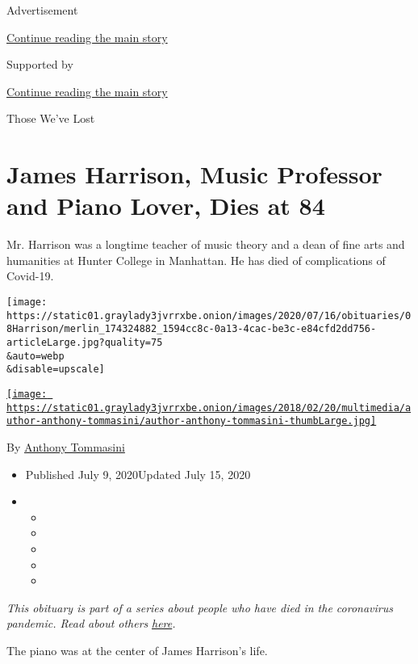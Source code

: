 Advertisement

\protect\hyperlink{after-top}{Continue reading the main story}

Supported by

\protect\hyperlink{after-sponsor}{Continue reading the main story}

Those We've Lost

\hypertarget{james-harrison-music-professor-and-piano-lover-dies-at-84}{%
\section{James Harrison, Music Professor and Piano Lover, Dies at
84}\label{james-harrison-music-professor-and-piano-lover-dies-at-84}}

Mr. Harrison was a longtime teacher of music theory and a dean of fine
arts and humanities at Hunter College in Manhattan. He has died of
complications of Covid-19.

\texttt{[image: https://static01.graylady3jvrrxbe.onion/images/2020/07/16/obituaries/08Harrison/merlin\_174324882\_1594cc8c-0a13-4cac-be3c-e84cfd2dd756-articleLarge.jpg?quality=75\\\&auto=webp\\\&disable=upscale]}

\href{https://www.nytimes3xbfgragh.onion/by/anthony-tommasini}{\texttt{[image: https://static01.graylady3jvrrxbe.onion/images/2018/02/20/multimedia/author-anthony-tommasini/author-anthony-tommasini-thumbLarge.jpg]}}

By
\href{https://www.nytimes3xbfgragh.onion/by/anthony-tommasini}{Anthony
Tommasini}

\begin{itemize}
\item
  Published July 9, 2020Updated July 15, 2020
\item
  \begin{itemize}
  \item
  \item
  \item
  \item
  \item
  \end{itemize}
\end{itemize}

\emph{This obituary is part of a series about people who have died in
the coronavirus pandemic. Read about others}
\href{https://www.nytimes3xbfgragh.onion/interactive/2020/obituaries/people-died-coronavirus-obituaries.html}{\emph{here}}\emph{.}

The piano was at the center of James Harrison's life.

